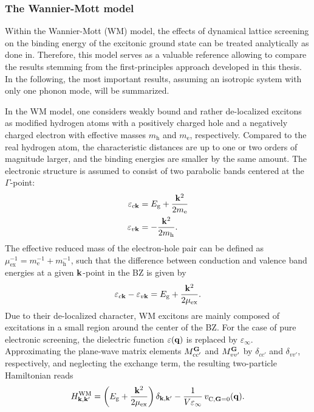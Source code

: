  
\subsubsection{The Wannier-Mott model}\label{subsec_wm}
Within the Wannier-Mott (WM) model, the effects of dynamical lattice screening on the binding energy of the excitonic ground state can be treated analytically as done in\cite{bechstedt2016many}. Therefore, this model serves as a valuable reference allowing to compare the results stemming from the first-principles approach developed in this thesis. In the following, the most important results, assuming an isotropic system with only one phonon mode, will be summarized.\par
In the WM model, one considers weakly bound and rather de-localized excitons as modified hydrogen atoms with a positively charged hole and a negatively charged electron with effective masses $m_\text{h}$ and $m_\text{e}$, respectively. Compared to the real hydrogen atom, the characteristic distances are up to one or two orders of magnitude larger, and the binding energies are smaller by the same amount. The electronic structure is assumed to consist of two parabolic bands centered at the $\Gamma$-point:
%
\begin{align}
    \varepsilon_{c\mathbf{k}} & = E_\text{g} + \frac{\mathbf{k}^2}{2m_\text{e}}\\
    \varepsilon_{v\mathbf{k}} & = -\frac{\mathbf{k}^2}{2m_\text{h}}.
\end{align}
%
The effective reduced mass of the electron-hole pair can be defined as $\mu^{-1}_\text{ex} = m^{-1}_\text{e} + m^{-1}_\text{h}$, such that the difference between conduction and valence band energies at a given $\mathbf{k}$-point in the BZ is given by
%
\begin{equation}
    \varepsilon_{c\mathbf{k}} - \varepsilon_{v\mathbf{k}} = E_\text{g} + \frac{\mathbf{k}^2}{2\mu_\text{ex}}.
\end{equation}
%
Due to their de-localized character, WM excitons are mainly composed of excitations in a small region around the center of the BZ. For the case of pure electronic screening, the dielectric function $\varepsilon(\mathbf{q})$ is replaced by  $\varepsilon_\infty$. Approximating the plane-wave matrix elements $M^{\mathbf{G}}_{cc'}$ and $M^{\mathbf{G}}_{vv'}$ by $\delta_{cc'}$ and $\delta_{vv'}$, respectively, and neglecting the exchange term, the resulting  two-particle Hamiltonian reads
%
\begin{equation}\label{wm_ham}
    H^\text{WM}_\mathbf{k,k'}  =  \left( E_\text{g} + \frac{\mathbf{k}^2}{2\mu_\text{ex}}\right)\delta_\mathbf{k,k'} - \frac{1}{V\varepsilon_\infty}\,v_{\text{C},\mathbf{G}=0}^{\phantom{I}}(\mathbf{q}).
\end{equation}
